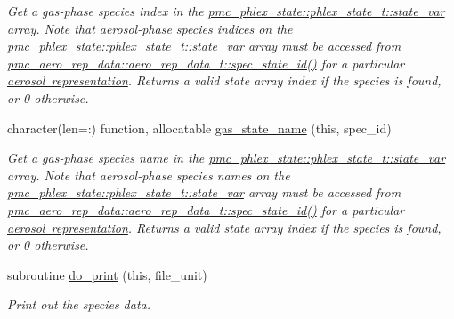 \begin{DoxyCompactItemize}
\begin{DoxyCompactList}\small\item\em Get a gas-\/phase species index in the {\ttfamily \mbox{\hyperlink{structpmc__phlex__state_1_1phlex__state__t_a78835cb552d483ebbfc7a6bc6f756918}{pmc\+\_\+phlex\+\_\+state\+::phlex\+\_\+state\+\_\+t\+::state\+\_\+var}}} array. Note that aerosol-\/phase species indices on the {\ttfamily \mbox{\hyperlink{structpmc__phlex__state_1_1phlex__state__t_a78835cb552d483ebbfc7a6bc6f756918}{pmc\+\_\+phlex\+\_\+state\+::phlex\+\_\+state\+\_\+t\+::state\+\_\+var}}} array must be accessed from {\ttfamily \mbox{\hyperlink{structpmc__aero__rep__data_1_1aero__rep__data__t_a6dcaf48caeaaed60aa065a0fac6c7ffc}{pmc\+\_\+aero\+\_\+rep\+\_\+data\+::aero\+\_\+rep\+\_\+data\+\_\+t\+::spec\+\_\+state\+\_\+id()}}} for a particular \mbox{\hyperlink{phlex_aero_rep}{aerosol representation}}. Returns a valid state array index if the species is found, or 0 otherwise. \end{DoxyCompactList}\item 
character(len=\+:) function, allocatable \mbox{\hyperlink{namespacepmc__chem__spec__data_a118f0f70c5bf5c1bba0651831083d2c1}{gas\+\_\+state\+\_\+name}} (this, spec\+\_\+id)
\begin{DoxyCompactList}\small\item\em Get a gas-\/phase species name in the {\ttfamily \mbox{\hyperlink{structpmc__phlex__state_1_1phlex__state__t_a78835cb552d483ebbfc7a6bc6f756918}{pmc\+\_\+phlex\+\_\+state\+::phlex\+\_\+state\+\_\+t\+::state\+\_\+var}}} array. Note that aerosol-\/phase species names on the {\ttfamily \mbox{\hyperlink{structpmc__phlex__state_1_1phlex__state__t_a78835cb552d483ebbfc7a6bc6f756918}{pmc\+\_\+phlex\+\_\+state\+::phlex\+\_\+state\+\_\+t\+::state\+\_\+var}}} array must be accessed from {\ttfamily \mbox{\hyperlink{structpmc__aero__rep__data_1_1aero__rep__data__t_a6dcaf48caeaaed60aa065a0fac6c7ffc}{pmc\+\_\+aero\+\_\+rep\+\_\+data\+::aero\+\_\+rep\+\_\+data\+\_\+t\+::spec\+\_\+state\+\_\+id()}}} for a particular \mbox{\hyperlink{phlex_aero_rep}{aerosol representation}}. Returns a valid state array index if the species is found, or 0 otherwise. \end{DoxyCompactList}\item 
subroutine \mbox{\hyperlink{namespacepmc__chem__spec__data_a241ef4f3c9e0a1968b339df331ca8d64}{do\+\_\+print}} (this, file\+\_\+unit)
\begin{DoxyCompactList}\small\item\em Print out the species data. \end{DoxyCompactList}\item 

\end{DoxyCompactItemize}
